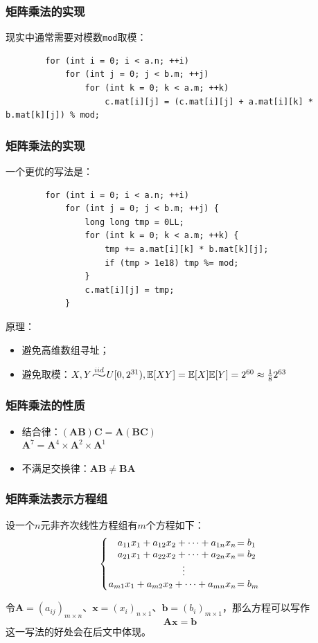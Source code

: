 \documentclass[9pt,dvipsnames]{beamer}
\newcommand{\scaledmath}[2][1.5]{\scalebox{#1}[1]{$#2$}}
\begin{document}
\begin{frame}[fragile]
	\frametitle{矩阵乘法的实现}
	现实中通常需要对模数\texttt{mod}取模：
	\begin{verbatim}
		for (int i = 0; i < a.n; ++i)
			for (int j = 0; j < b.m; ++j)
				for (int k = 0; k < a.m; ++k)
					c.mat[i][j] = (c.mat[i][j] + a.mat[i][k] * b.mat[k][j]) % mod;
	\end{verbatim}
\end{frame}
\begin{frame}[fragile]
	\frametitle{矩阵乘法的实现}
	一个更优的写法是：
	\begin{verbatim}
		for (int i = 0; i < a.n; ++i)
			for (int j = 0; j < b.m; ++j) {
				long long tmp = 0LL;
				for (int k = 0; k < a.m; ++k) {
					tmp += a.mat[i][k] * b.mat[k][j];
					if (tmp > 1e18) tmp %= mod;
				}
				c.mat[i][j] = tmp;
			}
	\end{verbatim}
	\pause
	原理：
	\begin{itemize}
		\item 避免高维数组寻址；
		\item 避免取模：$X,Y\overset{iid}{\scaledmath[2]{\sim}} U[0,2^{31}), \mathbb{E}[XY]=\mathbb{E}[X]\mathbb{E}[Y]=2^{60}\approx \frac{1}{8} 2^{63}$
	\end{itemize}
\end{frame}
\begin{frame}
	\frametitle{矩阵乘法的性质}
	\begin{itemize}
		\item 结合律：$(\mathbf{AB})\mathbf{C} = \mathbf{A}(\mathbf{BC})$ \\
			\hspace{4em}$\mathbf{A}^7=\mathbf{A}^4\times\mathbf{A}^2\times\mathbf{A}^1$
		\item 不满足交换律：$\mathbf{AB}\neq \mathbf{BA}$
	\end{itemize}
\end{frame}
\begin{frame}
	\frametitle{矩阵乘法表示方程组}
	设一个$n$元非齐次线性方程组有$m$个方程如下：
	\[ \arraycolsep=0.5pt
	\left\{\begin{array}{rl}
		a_{11}x_1+a_{12}x_2+\cdots+a_{1n}x_n & = b_1 \\
		a_{21}x_1+a_{22}x_2+\cdots+a_{2n}x_n & = b_2 \\
		\multicolumn{2}{c}{\vdots} \\
		a_{m1}x_1+a_{m2}x_2+\cdots+a_{mn}x_n & = b_m \\
	\end{array}\right. \]

	令$\mathbf{A}=(a_{ij})_{m\times n}$、$\mathbf{x}=(x_i)_{n\times 1}$、$\mathbf{b}=(b_i)_{m\times 1}$，那么方程可以写作
	\[ \mathbf{Ax}=\mathbf{b} \]
	这一写法的好处会在后文中体现。
\end{frame}
\end{document}
